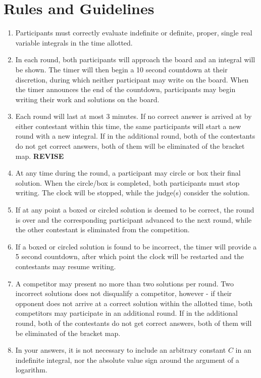 \documentclass{article}
\begin{document}
\section{Rules and Guidelines}

\begin{enumerate}
    \item
  Participants must correctly evaluate indefinite or definite, proper,
  single real variable integrals in the time allotted.
\item
  In each round, both participants will approach the board and an
  integral will be shown. The timer will then begin a 10 second
  countdown at their discretion, during which neither participant may
  write on the board. When the timer announces the end of the countdown,
  participants may begin writing their work and solutions on the board.
\item
  Each round will last at most 3 minutes. If no correct answer is
  arrived at by either contestant within this time, the same
  participants will start a new round with a new integral. If in the
  additional round, both of the contestants do not get correct answers,
  both of them will be eliminated of the bracket map. \textbf{REVISE}
\item
  At any time during the round, a participant may circle or box their
  final solution. When the circle/box is completed, both participants
  must stop writing. The clock will be stopped, while the judge(s)
  consider the solution.
\item
  If at any point a boxed or circled solution is deemed to be correct,
  the round is over and the corresponding participant advanced to the
  next round, while the other contestant is eliminated from the
  competition.
\item
  If a boxed or circled solution is found to be incorrect, the timer
  will provide a 5 second countdown, after which point the clock will be
  restarted and the contestants may resume writing.
\item
  A competitor may present no more than two solutions per round. Two
  incorrect solutions does not disqualify a competitor, however - if
  their opponent does not arrive at a correct solution within the
  allotted time, both competitors may participate in an additional
  round. If in the additional round, both of the contestants do not get
  correct answers, both of them will be eliminated of the bracket map.
\item
  In your answers, it is not necessary to include an arbitrary constant
  $C$ in an indefinite integral, nor the absolute value sign around the
  argument of a logarithm.

\end{enumerate}
\end{document}
